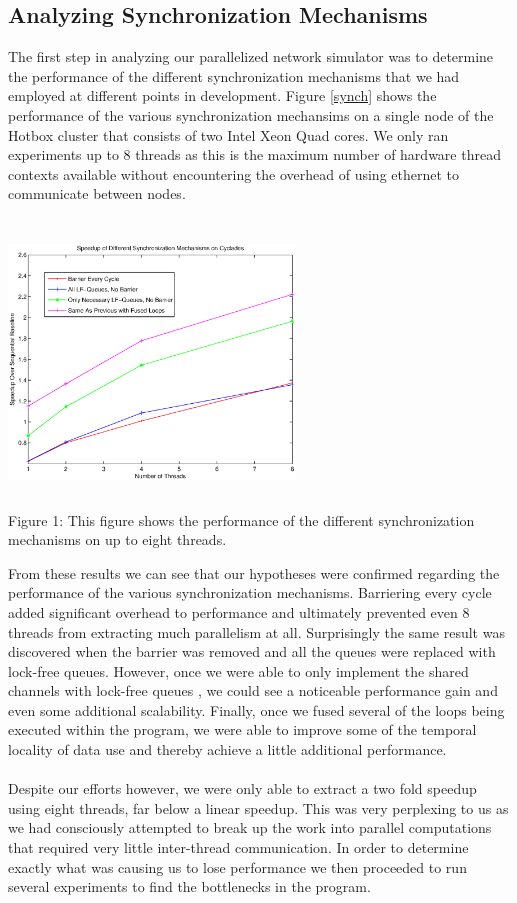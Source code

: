 \documentclass{article}
\begin{document}
\begin{multicols}{2}
\subsection{Analyzing Synchronization Mechanisms}
The first step in analyzing our parallelized network simulator was to
determine the performance of the different synchronization mechanisms that
we had employed at different points in development.  Figure \ref{synch}
shows the performance of the various synchronization mechansims on a
single node of the Hotbox cluster that consists of two Intel Xeon Quad
cores.  We only ran experiments up to 8 threads as this is the maximum
number of hardware thread contexts available without encountering the
overhead of using ethernet to communicate between nodes.\\
\begin{center}
\includegraphics[width=3in,height=3in]{synch.eps} \\
\small{Figure 1: This figure shows the performance of the different
synchronization mechanisms on up to eight threads.}
\end{center}
From these results we can see that our hypotheses were confirmed regarding
the performance of the various synchronization mechanisms.  Barriering
every cycle added significant overhead to performance and ultimately
prevented even 8 threads from extracting much parallelism at all.
Surprisingly the same result was discovered when the barrier was removed and
all the queues were replaced with lock-free queues.  However, once we were
able to only implement the shared channels with lock-free queues , we could see a noticeable performance gain and even some
additional scalability.  Finally, once we fused several of the loops being
executed within the program, we were able to improve some of the temporal
locality of data use and thereby achieve a little additional
performance.\\
~\\
Despite our efforts however, we were only able to extract a two fold
speedup using eight threads, far below a linear speedup.  This was very
perplexing to us as we had consciously attempted to break up the work into
parallel computations that required very little inter-thread
communication.  In order to determine exactly what was causing us to lose
performance we then proceeded to run several experiments to find the
bottlenecks in the program.


\end{multicols}
\end{document}
